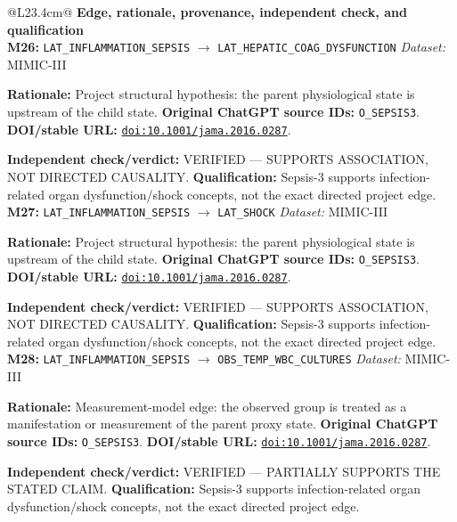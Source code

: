 \begin{tabular}{@{}L{23.4cm}@{}}
\toprule
\textbf{Edge, rationale, provenance, independent check, and qualification}\\
\midrule
\textbf{M26:} \nolinkurl{LAT_INFLAMMATION_SEPSIS} $\rightarrow$ \nolinkurl{LAT_HEPATIC_COAG_DYSFUNCTION} \hfill \textit{Dataset:} MIMIC-III\par\textbf{Rationale:} Project structural hypothesis: the parent physiological state is upstream of the child state. \textbf{Original ChatGPT source IDs:} \nolinkurl{O_SEPSIS3}. \textbf{DOI/stable URL:} \href{https://doi.org/10.1001/jama.2016.0287}{\nolinkurl{doi:10.1001/jama.2016.0287}}.\par\textbf{Independent check/verdict:} VERIFIED --- SUPPORTS ASSOCIATION, NOT DIRECTED CAUSALITY. \textbf{Qualification:} Sepsis-3 supports infection-related organ dysfunction/shock concepts, not the exact directed project edge. \\
\addlinespace[2pt]
\midrule
\textbf{M27:} \nolinkurl{LAT_INFLAMMATION_SEPSIS} $\rightarrow$ \nolinkurl{LAT_SHOCK} \hfill \textit{Dataset:} MIMIC-III\par\textbf{Rationale:} Project structural hypothesis: the parent physiological state is upstream of the child state. \textbf{Original ChatGPT source IDs:} \nolinkurl{O_SEPSIS3}. \textbf{DOI/stable URL:} \href{https://doi.org/10.1001/jama.2016.0287}{\nolinkurl{doi:10.1001/jama.2016.0287}}.\par\textbf{Independent check/verdict:} VERIFIED --- SUPPORTS ASSOCIATION, NOT DIRECTED CAUSALITY. \textbf{Qualification:} Sepsis-3 supports infection-related organ dysfunction/shock concepts, not the exact directed project edge. \\
\addlinespace[2pt]
\midrule
\textbf{M28:} \nolinkurl{LAT_INFLAMMATION_SEPSIS} $\rightarrow$ \nolinkurl{OBS_TEMP_WBC_CULTURES} \hfill \textit{Dataset:} MIMIC-III\par\textbf{Rationale:} Measurement-model edge: the observed group is treated as a manifestation or measurement of the parent proxy state. \textbf{Original ChatGPT source IDs:} \nolinkurl{O_SEPSIS3}. \textbf{DOI/stable URL:} \href{https://doi.org/10.1001/jama.2016.0287}{\nolinkurl{doi:10.1001/jama.2016.0287}}.\par\textbf{Independent check/verdict:} VERIFIED --- PARTIALLY SUPPORTS THE STATED CLAIM. \textbf{Qualification:} Sepsis-3 supports infection-related organ dysfunction/shock concepts, not the exact directed project edge. \\
\addlinespace[2pt]

\end{tabular}
